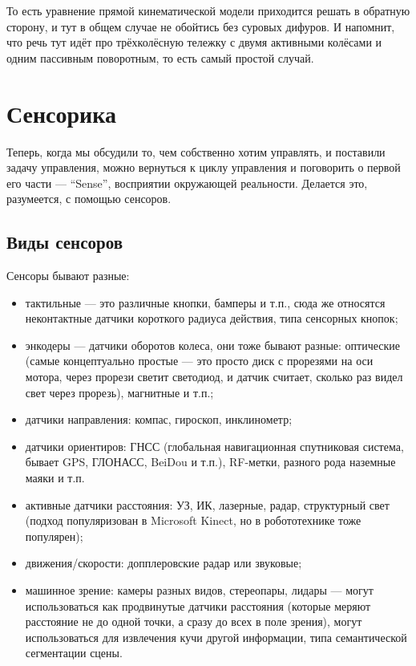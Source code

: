 \documentclass{../../text-style}
\begin{document}
То есть уравнение прямой кинематической модели приходится решать в обратную сторону, и тут в общем случае не обойтись без суровых дифуров. И напомнит, что речь тут идёт про трёхколёсную тележку с двумя активными колёсами и одним пассивным поворотным, то есть самый простой случай.

\section{Сенсорика}

Теперь, когда мы обсудили то, чем собственно хотим управлять, и поставили задачу управления, можно вернуться к циклу управления и поговорить о первой его части --- \enquote{Sense}, восприятии окружающей реальности. Делается это, разумеется, с помощью сенсоров.

\subsection{Виды сенсоров}

Сенсоры бывают разные:

\begin{itemize}
    \item тактильные --- это различные кнопки, бамперы и т.п., сюда же относятся неконтактные датчики короткого радиуса действия, типа сенсорных кнопок;
    \item энкодеры --- датчики оборотов колеса, они тоже бывают разные: оптические (самые концептуально простые --- это просто диск с прорезями на оси мотора, через прорези светит светодиод, и датчик считает, сколько раз видел свет через прорезь), магнитные и т.п.;
    \item датчики направления: компас, гироскоп, инклинометр;
    \item датчики ориентиров: ГНСС (глобальная навигационная спутниковая система, бывает GPS, ГЛОНАСС, BeiDou и т.п.), RF-метки, разного рода наземные маяки и т.п.
    \item активные датчики расстояния: УЗ, ИК, лазерные, радар, структурный свет (подход популяризован в Microsoft Kinect, но в робототехнике тоже популярен);
    \item движения/скорости: допплеровские радар или звуковые;
    \item машинное зрение: камеры разных видов, стереопары, лидары --- могут использоваться как продвинутые датчики расстояния (которые меряют расстояние не до одной точки, а сразу до всех в поле зрения), могут использоваться для извлечения кучи другой информации, типа семантической сегментации сцены.
\end{itemize}
\end{document}
